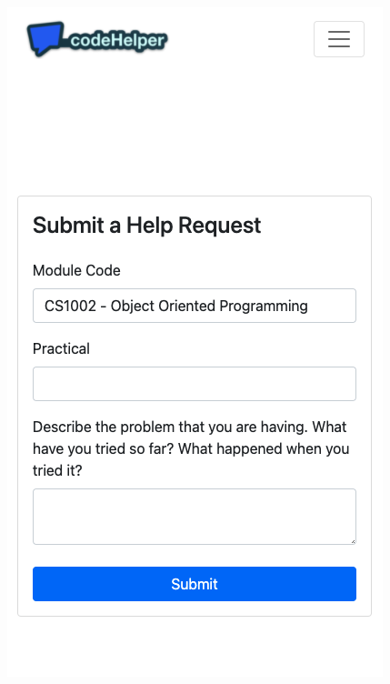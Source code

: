 \begin{figure}[H]
\centering
\begin{minipage}{.5\textwidth}
  \centering
    \includegraphics[width=\textwidth]{8implementation/images/mobStudForm.png}
  \label{fig:mobStudForm}
\end{minipage}%
\begin{minipage}{.5\textwidth}
  \centering

\end{minipage}
\end{figure}
